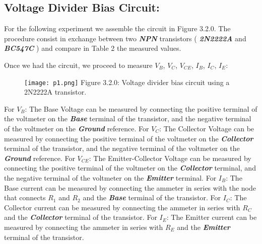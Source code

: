 \subsection{Voltage Divider Bias Circuit:}

For the following experiment we assemble the circuit in Figure 3.2.0. The procedure consist in exchange between two {\bfseries\itshape NPN} transistors ( {\bfseries\itshape 2N2222A} and {\bfseries\itshape BC547C} ) and compare in Table 2 the measured values. \hfill \break

Once we had the circuit, we proceed to measure $V_{B}$, $V_{C}$, $V_{CE}$, $I_{B}$, $I_{C}$, $I_{E}$: \hfill \break

\begin{multicols}{2}
\begin{figure}[H]
\texttt{[image: p1.png]}
\centering \linebreak \linebreak Figure 3.2.0: Voltage divider bias circuit using a 2N2222A transistor.
\end{figure}

\begin{tasks}
\task For $V_{B}$: The Base Voltage can be measured by connecting the positive terminal of the voltmeter on the {\bfseries\itshape Base} terminal of the transistor, and the negative terminal of the voltmeter on the {\bfseries\itshape Ground} reference.
\task For $V_{C}$: The Collector Voltage can be measured by connecting the positive terminal of the voltmeter on the {\bfseries\itshape Collector} terminal of the transistor, and the negative terminal of the voltmeter on the {\bfseries\itshape Ground} reference.
\task For $V_{CE}$: The Emitter-Collector Voltage can be measured by connecting the positive terminal of the voltmeter on the {\bfseries\itshape Collector} terminal, and the negative terminal of the voltmeter on the {\bfseries\itshape Emitter} terminal.
\task For $I_{B}$: The Base current can be measured by connecting the ammeter in series with the node that connects {\bfseries\itshape $R_{1}$} and {\bfseries\itshape $R_{2}$} and the {\bfseries\itshape Base} terminal of the transistor.
\task For $I_{C}$: The Collector current can be measured by connecting the ammeter in series with {\bfseries\itshape $R_{C}$} and the {\bfseries\itshape Collector} terminal of the transistor.
\task For $I_{E}$: The Emitter current can be measured by connecting the ammeter in series with {\bfseries\itshape $R_{E}$} and the {\bfseries\itshape Emitter} terminal of the transistor.
\end{tasks}
\end{multicols} \hfill

